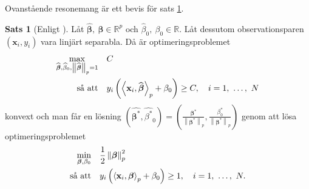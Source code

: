 \documentclass[a4paper, 12pt]{report}
\theoremstyle{definition}
\newtheorem{thm}{Sats}[section]
\newtheorem{cor}[thm]{Korollarium}
\theoremstyle{remark}
\newcommand{\bfbeta}{{\boldsymbol{\beta}}}
\newcommand{\bfx}{\mathbf{x}}
\newcommand{\llangle}{\left\langle}
\newcommand{\rrangle}{\right\rangle}
\newcommand{\inner}[2]{\llangle #1, #2 \rrangle}
\begin{document}
Ovanstående resonemang är ett bevis för sats \ref{thm:primallinearproblem}.
\begin{thm}[Enligt \cite{ESL}]\label{thm:primallinearproblem}
	Låt $\widehat{\bfbeta},~\bfbeta \in \mathbb{R}^p$ och $\widehat{\beta}_0,~\beta_0 \in \mathbb{R}$. Låt dessutom observationsparen $\left(\mathbf{x}_i, y_i\right)$ vara linjärt separabla. Då är optimeringsproblemet
	\begin{equation*}
	\begin{aligned}
	\operatornamewithlimits{max}_{\widehat{\bfbeta}, \widehat{\beta}_0, \left\|\widehat{\bfbeta}
\right\|_p=1} & & &C\\
	\text{så att} & & &y_i\left(\inner{\bfx_i}{\widehat{\bfbeta}}_p+\beta_0\right)\geq C,\quad i=1,~\dots,~N
	\end{aligned}
	\end{equation*}
	konvext och man får en lösning $\left(\widehat{\bfbeta^*}, \widehat{\beta^*}_0\right)=\left(\frac{\bfbeta^*}{\left\|\bfbeta^*\right\|_p}, \frac{\beta^*_0}{\left\|\bfbeta^*\right\|_p}\right)$ genom att lösa optimeringsproblemet
	\begin{equation*}
	\begin{aligned}
	\operatornamewithlimits{min}_{\bfbeta, \beta_0} & & &\frac{1}{2}\left\|\bfbeta
\right\|_p^2\\
	\text{så att} & & &y_i\left(\inner{\bfx_i}{\bfbeta}_p+\beta_0\right)\geq 1,\quad i=1,~\dots,~N.
	\end{aligned}
	\end{equation*}
\end{thm}
\end{document}
